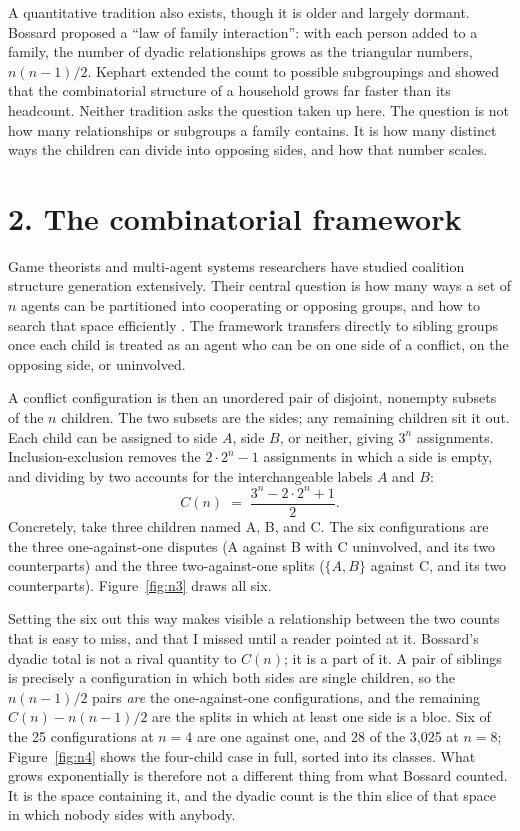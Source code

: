\documentclass[11pt]{article}
\begin{document}
A quantitative tradition also exists, though it is older and largely dormant. Bossard
\cite{bossard1945} proposed a ``law of family interaction'': with each person added
to a family, the number of dyadic relationships grows as the triangular numbers,
$n(n-1)/2$. Kephart \cite{kephart1950} extended the count to possible subgroupings
and showed that the combinatorial structure of a household grows far faster than its
headcount. Neither tradition asks the question taken up here. The question is not how
many relationships or subgroups a family contains. It is how many distinct ways the
children can divide into opposing sides, and how that number scales.

\section*{2. The combinatorial framework}

Game theorists and multi-agent systems researchers have studied coalition structure
generation extensively. Their central question is how many ways a set of $n$ agents
can be partitioned into cooperating or opposing groups, and how to search that space
efficiently \cite{sandholm1999, rahwan2015}. The framework transfers directly to
sibling groups once each child is treated as an agent who can be on one side of a
conflict, on the opposing side, or uninvolved.

A conflict configuration is then an unordered pair of disjoint, nonempty subsets of
the $n$ children. The two subsets are the sides; any remaining children sit it out.
Each child can be assigned to side $A$, side $B$, or neither, giving $3^{n}$
assignments. Inclusion-exclusion removes the $2\cdot 2^{n} - 1$ assignments in which
a side is empty, and dividing by two accounts for the interchangeable labels $A$ and
$B$:
\begin{equation}
C(n) \;=\; \frac{3^{n} - 2\cdot 2^{n} + 1}{2}.
\label{eq:main}
\end{equation}
Concretely, take three children named A, B, and C. The six configurations are the
three one-against-one disputes (A against B with C uninvolved, and its two
counterparts) and the three two-against-one splits ($\{A,B\}$ against C, and its two
counterparts). Figure~\ref{fig:n3} draws all six.

Setting the six out this way makes visible a relationship between the two counts that
is easy to miss, and that I missed until a reader pointed at it. Bossard's dyadic
total is not a rival quantity to $C(n)$; it is a part of it. A pair of siblings is
precisely a configuration in which both sides are single children, so the $n(n-1)/2$
pairs \emph{are} the one-against-one configurations, and the remaining
$C(n) - n(n-1)/2$ are the splits in which at least one side is a bloc. Six of the 25
configurations at $n = 4$ are one against one, and 28 of the 3{,}025 at $n = 8$;
Figure~\ref{fig:n4} shows the four-child case in full, sorted into its classes. What
grows exponentially is therefore not a different thing from what Bossard counted. It
is the space containing it, and the dyadic count is the thin slice of that space in
which nobody sides with anybody.
\end{document}
